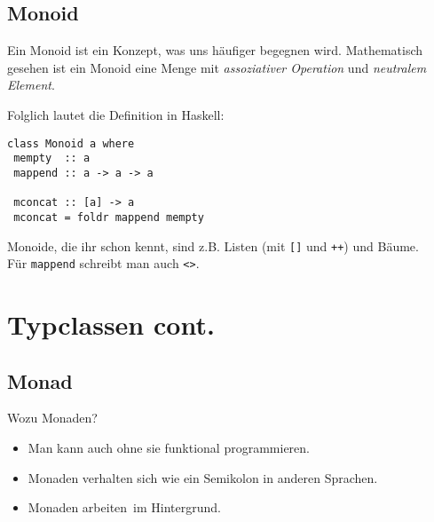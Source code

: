 \documentclass{beamer}
\begin{document}

\subsection{Monoid}
\begin{frame}[fragile]
Ein Monoid ist ein Konzept, was uns häufiger begegnen wird. Mathematisch gesehen ist ein Monoid eine Menge mit \textit{assoziativer Operation} und \textit{neutralem Element}.\pause \bigskip

Folglich lautet die Definition in Haskell:
\begin{verbatim}
class Monoid a where
 mempty  :: a
 mappend :: a -> a -> a
 
 mconcat :: [a] -> a
 mconcat = foldr mappend mempty
\end{verbatim}
\pause
Monoide, die ihr schon kennt, sind z.B. Listen (mit \texttt{[]} und \texttt{++}) und Bäume.\\
\pause
Für \texttt{mappend} schreibt man auch \texttt{<>}.
\end{frame}


\section{Typclassen cont.}

\subsection{Monad}
\begin{frame}
Wozu Monaden?
\pause
\begin{itemize}
 \item Man kann auch ohne sie funktional programmieren.
 \pause
 \item Monaden verhalten sich wie ein Semikolon in anderen Sprachen.
 \pause
 \item Monaden \glqq arbeiten\grqq \ im Hintergrund.
\end{itemize}

\end{frame}
\end{document}
